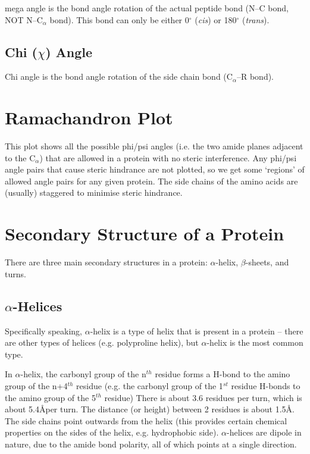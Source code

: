 mega angle is the bond angle rotation of the actual peptide bond (N--C bond, NOT N--C$_{\alpha}$ bond).
This bond can only be either 0$^{\circ}$ (\textit{cis}) or 180$^{\circ}$ (\textit{trans}).

\subsection{Chi ($\chi$) Angle}

Chi angle is the bond angle rotation of the side chain bond (C$_{\alpha}$--R bond).

\section{Ramachandron Plot}

This plot shows all the possible phi/psi angles (i.e. the two amide planes adjacent to the C$_{\alpha}$) that are allowed in a protein with no steric interference.
Any phi/psi angle pairs that cause steric hindrance are not plotted, so we get some `regions' of allowed angle pairs for any given protein.
The side chains of the amino acids are (usually) staggered to minimise steric hindrance.

\section{Secondary Structure of a Protein}

There are three main secondary structures in a protein: $\alpha$-helix, $\beta$-sheets, and turns.

\subsection{$\alpha$-Helices}

Specifically speaking, $\alpha$-helix is a type of helix that is present in a protein -- there are other types of helices (e.g. polyproline helix), but $\alpha$-helix is the most common type.

In $\alpha$-helix, the carbonyl group of the n$^{th}$ residue forms a H-bond to the amino group of the n+4$^{th}$ residue (e.g. the carbonyl group of the 1$^{st}$ residue H-bonds to the amino group of the 5$^{th}$ residue)
There is about 3.6 residues per turn, which is about 5.4\AA per turn.
The distance (or height) between 2 residues is about 1.5\AA.
The side chains point outwards from the helix (this provides certain chemical properties on the sides of the helix, e.g. hydrophobic side). 
$\alpha$-helices are dipole in nature, due to the amide bond polarity, all of which points at a single direction.

